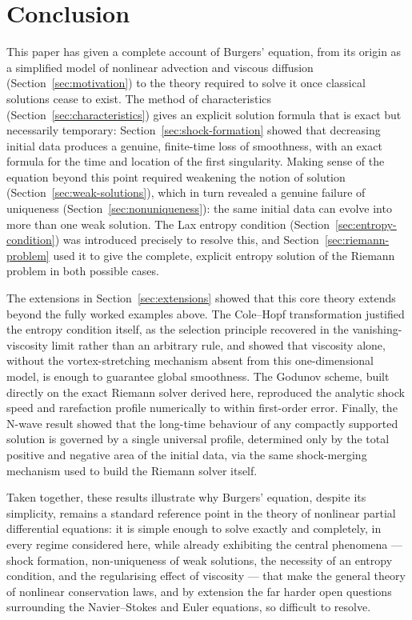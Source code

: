 \section{Conclusion}
\label{sec:conclusion}

This paper has given a complete account of Burgers' equation, from its
origin as a simplified model of nonlinear advection and viscous diffusion
(Section~\ref{sec:motivation}) to the theory required to solve it once
classical solutions cease to exist. The method of characteristics
(Section~\ref{sec:characteristics}) gives an explicit solution formula
that is exact but necessarily temporary: Section~\ref{sec:shock-formation}
showed that decreasing initial data produces a genuine, finite-time loss
of smoothness, with an exact formula for the time and location of the
first singularity. Making sense of the equation beyond this point
required weakening the notion of solution
(Section~\ref{sec:weak-solutions}), which in turn revealed a genuine
failure of uniqueness (Section~\ref{sec:nonuniqueness}): the same initial
data can evolve into more than one weak solution. The Lax entropy
condition (Section~\ref{sec:entropy-condition}) was introduced precisely
to resolve this, and Section~\ref{sec:riemann-problem} used it to give
the complete, explicit entropy solution of the Riemann problem in both
possible cases.

The extensions in Section~\ref{sec:extensions} showed that this core
theory extends beyond the fully worked examples above. The Cole--Hopf
transformation justified the entropy condition itself, as the selection
principle recovered in the vanishing-viscosity limit rather than an
arbitrary rule, and showed that viscosity alone, without the
vortex-stretching mechanism absent from this one-dimensional model, is
enough to guarantee global smoothness. The Godunov scheme, built
directly on the exact Riemann solver derived here, reproduced the
analytic shock speed and rarefaction profile numerically to within
first-order error. Finally, the N-wave result showed that the long-time
behaviour of any compactly supported solution is governed by a single
universal profile, determined only by the total positive and negative
area of the initial data, via the same shock-merging mechanism used to
build the Riemann solver itself.

Taken together, these results illustrate why Burgers' equation, despite
its simplicity, remains a standard reference point in the theory of
nonlinear partial differential equations: it is simple enough to solve
exactly and completely, in every regime considered here, while already
exhibiting the central phenomena --- shock formation, non-uniqueness of
weak solutions, the necessity of an entropy condition, and the
regularising effect of viscosity --- that make the general theory of
nonlinear conservation laws, and by extension the far harder open
questions surrounding the Navier--Stokes and Euler equations, so
difficult to resolve.